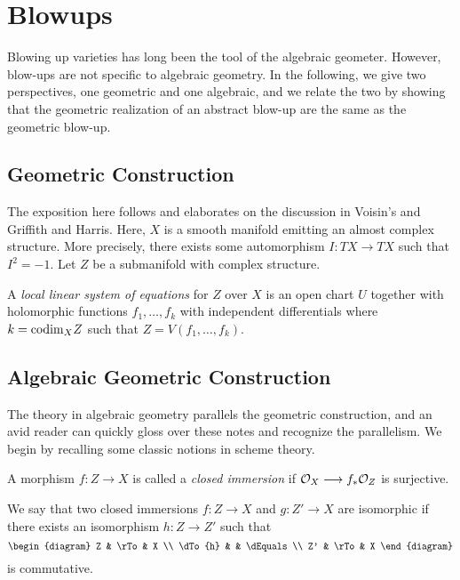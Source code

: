 \section{Blowups}
\newcommand{\CP}{\mathbb{CP}}
\newcommand{\del}{\partial}

Blowing up varieties has long been the tool of the algebraic
geometer. However, blow-ups are not specific to algebraic geometry.
In the following, we give two perspectives, one geometric and one
algebraic, and we relate the two by showing that the geometric
realization of an abstract blow-up are the same as the geometric
blow-up.

\subsection{Geometric Construction}

The exposition here follows and elaborates on the discussion in
Voisin's and Griffith and Harris. Here, $X$ is a smooth manifold
emitting an almost complex structure. More precisely, there exists
some automorphism $I: TX \to TX$ such that $I^2 = -1$. Let $Z$ be
a submanifold with complex structure.

\begin{definition}
A \emph{local linear system of equations} for $Z$ over $X$ is an
open chart $U$ together with holomorphic functions $f_1,\dots,
f_k$ with independent differentials where $k = \mathrm{codim}_X Z$ such 
that $Z = V(f_1,\dots,f_k)$. 
\end{definition}

\begin{prop}

\end{prop}

\subsection{Algebraic Geometric Construction}

The theory in algebraic geometry parallels the geometric 
construction, and an avid reader can quickly gloss over these
notes and recognize the parallelism. We begin by recalling 
some classic notions in scheme theory.

\begin{definition}
A morphism $f: Z \to X$ is called a \emph{closed immersion} if $\mathcal{O}_X \longrightarrow 
f_*\mathcal{O}_Z$ is surjective.
\end{definition}

We say that two closed immersions $f: Z \to X$ and $g: Z' \to X$ 
are isomorphic if there exists an isomorphism $h: Z \to Z'$ such 
that
\[
\begin{diagram}
Z       & \rTo & X        \\
\dTo{h} &      & \dEquals \\
Z'      & \rTo & X
\end{diagram}
\]
is commutative.

